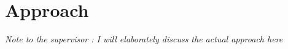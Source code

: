 \chapter{Approach}
\textit{Note to the supervisor : I will elaborately discuss the actual approach here}